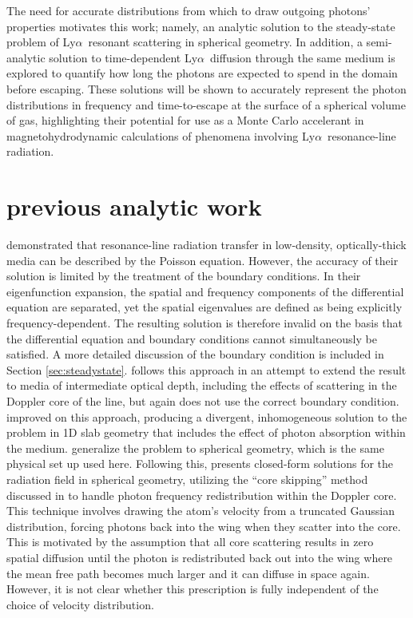 \documentclass{aastex63}
\newcommand\lya{Ly$\alpha$\ }
\begin{document}
The need for accurate distributions from which to draw outgoing photons' properties motivates this work; namely, an analytic solution to the steady-state problem of \lya resonant scattering in spherical geometry. In addition, a semi-analytic solution to time-dependent \lya diffusion through the same medium is explored to quantify how long the photons are expected to spend in the domain before escaping. These solutions will be shown to accurately represent the photon distributions in frequency and time-to-escape at the surface of a spherical volume of gas, highlighting their potential for use as a Monte Carlo accelerant in magnetohydrodynamic calculations of phenomena involving \lya resonance-line radiation.

\section{ previous analytic work }

\citet{1973MNRAS.162...43H, 1974MNRAS.166..373H} demonstrated that resonance-line radiation transfer in low-density, optically-thick media can be described by the Poisson equation. However, the accuracy of their solution is limited by the treatment of the boundary conditions. In their eigenfunction expansion, the spatial and frequency components of the differential equation are separated, yet the spatial eigenvalues are defined as being explicitly frequency-dependent. The resulting solution is therefore invalid on the basis that the differential equation and boundary conditions cannot simultaneously be satisfied. A more detailed discussion of the boundary condition is included in Section \ref{sec:steadystate}. \citet{1990ApJ...350..216N} follows this approach in an attempt to extend the result to media of intermediate optical depth, including the effects of scattering in the Doppler core of the line, but again does not use the correct boundary condition. \citet{?} improved on this approach, producing a divergent, inhomogeneous solution to the problem in 1D slab geometry that includes the effect of photon absorption within the medium. \citet{2006ApJ...649...14D} generalize the problem to spherical geometry, which is the same physical set up used here. Following this, \citet{2020arXiv200509692L} presents closed-form solutions for the radiation field in spherical geometry, utilizing the ``core skipping'' method discussed in \citet{2015MNRAS.449.4336S} to handle photon frequency redistribution within the Doppler core. This technique involves drawing the atom's velocity from a truncated Gaussian distribution, forcing photons back into the wing when they scatter into the core. This is motivated by the assumption that all core scattering results in zero spatial diffusion until the photon is redistributed back out into the wing where the mean free path becomes much larger and it can diffuse in space again. However, it is not clear whether this prescription is fully independent of the choice of velocity distribution.
\end{document}
